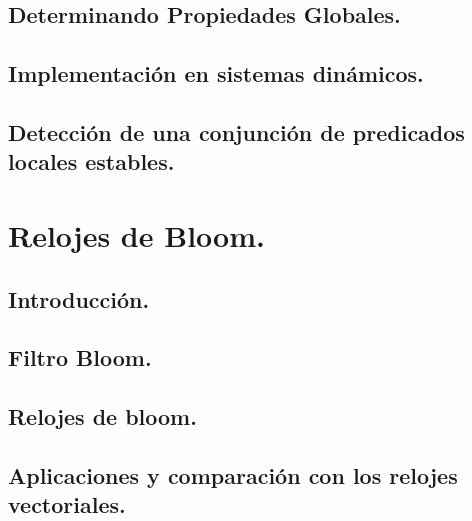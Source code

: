 \documentclass[9pt]{beamer}
\begin{document}
\subsection{Determinando Propiedades Globales.}

\subsection{Implementación en sistemas dinámicos.}
\subsection{Detección de una conjunción de predicados locales estables.}


\section{Relojes de Bloom.}
\subsection{Introducción.}
\subsection{Filtro Bloom.}
\subsection{Relojes de bloom.}
\subsection{Aplicaciones y comparación con los relojes vectoriales.}

\end{document}

